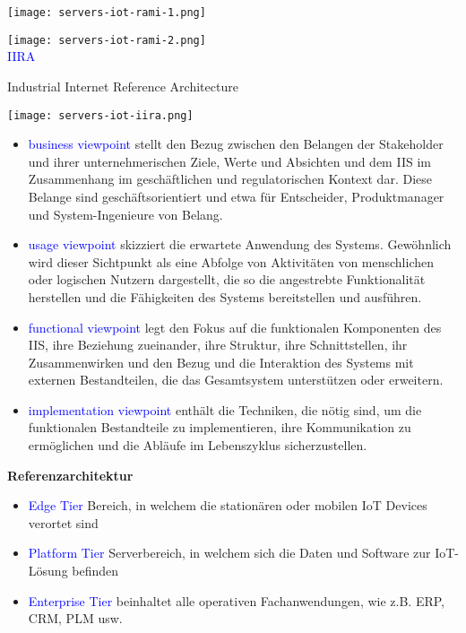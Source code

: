 \texttt{[image: servers-iot-rami-1.png]}

\texttt{[image: servers-iot-rami-2.png]} \\

\textcolor{blue}{IIRA}

Industrial Internet Reference Architecture

\texttt{[image: servers-iot-iira.png]}

\begin{itemize}
    \item \textcolor{blue}{business viewpoint} stellt den Bezug zwischen den Belangen der Stakeholder und ihrer unternehmerischen Ziele, Werte und Absichten und dem IIS im Zusammenhang im geschäftlichen und regulatorischen Kontext dar. Diese Belange sind geschäftsorientiert und etwa für Entscheider, Produktmanager und System-Ingenieure von Belang.
    \item \textcolor{blue}{usage viewpoint} skizziert die erwartete Anwendung des Systems. Gewöhnlich wird dieser Sichtpunkt als eine Abfolge von Aktivitäten von menschlichen oder logischen Nutzern dargestellt, die so die angestrebte Funktionalität herstellen und die Fähigkeiten des Systems bereitstellen und ausführen.
    \item \textcolor{blue}{functional viewpoint} legt den Fokus auf die funktionalen Komponenten des IIS, ihre Beziehung zueinander, ihre Struktur, ihre Schnittstellen, ihr Zusammenwirken und den Bezug und die Interaktion des Systems mit externen Bestandteilen, die das Gesamtsystem unterstützen oder erweitern.
    \item \textcolor{blue}{implementation viewpoint} enthält die Techniken, die nötig sind, um die funktionalen Bestandteile zu implementieren, ihre Kommunikation zu ermöglichen und die Abläufe im Lebenszyklus sicherzustellen.
\end{itemize}
\vspace{10pt}
\columnbreak
\textbf{Referenzarchitektur}

\begin{itemize}
    \item \textcolor{blue}{Edge Tier} Bereich, in welchem die stationären oder mobilen IoT Devices verortet sind
    \item \textcolor{blue}{Platform Tier} Serverbereich, in welchem sich die Daten und Software zur IoT-Lösung befinden
    \item \textcolor{blue}{Enterprise Tier} beinhaltet alle operativen Fachanwendungen, wie z.B. ERP, CRM, PLM usw.
\end{itemize}

